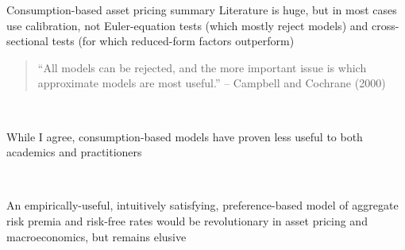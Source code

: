 \documentclass[xcolor=table, aspectratio=169]{beamer}
\begin{document}

\begin{frame}{Consumption-based asset pricing summary}
Literature is huge, but in most cases use calibration, not Euler-equation tests (which mostly reject models) and cross-sectional tests (for which reduced-form factors outperform)
\begin{quote}
``All models can be rejected, and the more important issue is which approximate models are most useful.'' -- Campbell and Cochrane (2000)
\end{quote}

~

While I agree, consumption-based models have proven less useful to both academics and practitioners

~

An empirically-useful, intuitively satisfying, preference-based model of aggregate risk premia and risk-free rates would be revolutionary in asset pricing and macroeconomics, but remains elusive
\end{frame}
\end{document}
